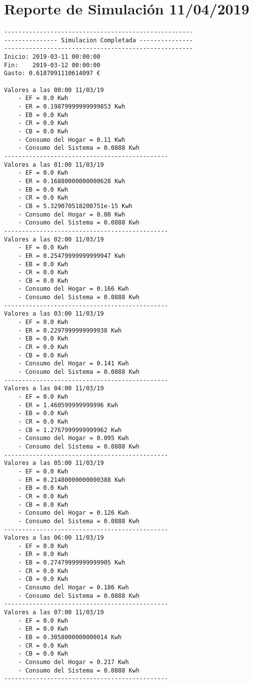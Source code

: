 \chapter{Reporte de Simulación 11/04/2019}
\label{cap:AnexoA}
\begin{lstlisting}[numbers=none,caption={Reporte de simulación 11/04},label={lst:simulationReport}]
-----------------------------------------------------
--------------- Simulacion Completada ---------------
-----------------------------------------------------
Inicio:	2019-03-11 00:00:00
Fin:	2019-03-12 00:00:00
Gasto: 0.6187091110614097 €

Valores a las 00:00 11/03/19
	- EF = 0.0 Kwh
	- ER = 0.19879999999999853 Kwh
	- EB = 0.0 Kwh
	- CR = 0.0 Kwh
	- CB = 0.0 Kwh
	- Consumo del Hogar = 0.11 Kwh
	- Consumo del Sistema = 0.0888 Kwh
----------------------------------------------
Valores a las 01:00 11/03/19
	- EF = 0.0 Kwh
	- ER = 0.16880000000000628 Kwh
	- EB = 0.0 Kwh
	- CR = 0.0 Kwh
	- CB = 5.329070518200751e-15 Kwh
	- Consumo del Hogar = 0.08 Kwh
	- Consumo del Sistema = 0.0888 Kwh
----------------------------------------------
Valores a las 02:00 11/03/19
	- EF = 0.0 Kwh
	- ER = 0.25479999999999947 Kwh
	- EB = 0.0 Kwh
	- CR = 0.0 Kwh
	- CB = 0.0 Kwh
	- Consumo del Hogar = 0.166 Kwh
	- Consumo del Sistema = 0.0888 Kwh
----------------------------------------------
Valores a las 03:00 11/03/19
	- EF = 0.0 Kwh
	- ER = 0.2297999999999938 Kwh
	- EB = 0.0 Kwh
	- CR = 0.0 Kwh
	- CB = 0.0 Kwh
	- Consumo del Hogar = 0.141 Kwh
	- Consumo del Sistema = 0.0888 Kwh
----------------------------------------------
Valores a las 04:00 11/03/19
	- EF = 0.0 Kwh
	- ER = 1.460599999999996 Kwh
	- EB = 0.0 Kwh
	- CR = 0.0 Kwh
	- CB = 1.2767999999999962 Kwh
	- Consumo del Hogar = 0.095 Kwh
	- Consumo del Sistema = 0.0888 Kwh
----------------------------------------------
Valores a las 05:00 11/03/19
	- EF = 0.0 Kwh
	- ER = 0.21480000000000388 Kwh
	- EB = 0.0 Kwh
	- CR = 0.0 Kwh
	- CB = 0.0 Kwh
	- Consumo del Hogar = 0.126 Kwh
	- Consumo del Sistema = 0.0888 Kwh
----------------------------------------------
Valores a las 06:00 11/03/19
	- EF = 0.0 Kwh
	- ER = 0.0 Kwh
	- EB = 0.27479999999999905 Kwh
	- CR = 0.0 Kwh
	- CB = 0.0 Kwh
	- Consumo del Hogar = 0.186 Kwh
	- Consumo del Sistema = 0.0888 Kwh
----------------------------------------------
Valores a las 07:00 11/03/19
	- EF = 0.0 Kwh
	- ER = 0.0 Kwh
	- EB = 0.3058000000000014 Kwh
	- CR = 0.0 Kwh
	- CB = 0.0 Kwh
	- Consumo del Hogar = 0.217 Kwh
	- Consumo del Sistema = 0.0888 Kwh
----------------------------------------------

\end{lstlisting}

